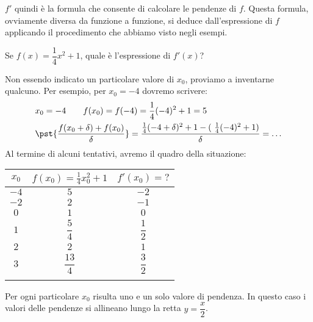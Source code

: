 \(f'\) quindi è la formula che consente di calcolare le pendenze 
di \(f\). Questa formula, ovviamente diversa da funzione a funzione, si deduce 
dall'espressione di \(f\) applicando il procedimento che abbiamo visto negli 
esempi.
\begin{esempio}
 Se \(f(x)=\dfrac{1}{4}x^2+1\), quale è l'espressione di \(f'(x)\)?
 
Non essendo indicato un particolare valore di \(x_0\), proviamo a inventarne 
qualcuno. Per esempio, per \(x_0=-4\) dovremo scrivere:
\begin{align*}
 &x_0= -4\quad\quad f(x_0)=f(-4)=\frac{1}{4}(-4)^2+1 = 5\\
&\pst{\dfrac{f(x_0+\delta)+f(x_0)}{\delta}}=\dfrac{\frac{1}{4}(-4+\delta)^2+1-(
 \ \frac{1}{4}(-4)^2+1)}{\delta}=\dots
\end{align*}
Al termine di alcuni tentativi, avremo il quadro della situazione:

 \begin{minipage}{0.48\textwidth}
 \begin{center}
\begin{tabular}{ccc}\toprule
\(x_0\) & \(f(x_0)=\frac{1}{4}x_0^2+1\) & \(f'(x_0)=?\) \\\midrule
\(-4\) & \(5\)     & \(-2\) \\
\(-2\) & \(2\)     &  \(-1\) \\
\(0\) & \(1\)      & \(0\)  \\
\(1\) & \(\dfrac{5}{4}\) & \(\dfrac{1}{2}\) \\
\(2\)  & \(2\)     & \(1\)\\
\(3\)  & \(\dfrac{13}{4}\) &\(\dfrac{3}{2}\)\\
\\ \bottomrule
\end{tabular}
\label{tab:temperaturea}
\end{center}
\end{minipage}
 \hfill
\begin{minipage}{.48 \textwidth}
\begin{inaccessibleblock}
\begin{center} \scalebox{1}{\funzioneederivata} \end{center}
\end{inaccessibleblock}
\label{graf:funzioneederivata}
\end{minipage}
\end{esempio}
Per ogni particolare \(x_0\) risulta uno e un solo valore di pendenza. In 
questo caso i valori delle pendenze si allineano lungo la retta 
\(y=\dfrac{x}{2}\).

